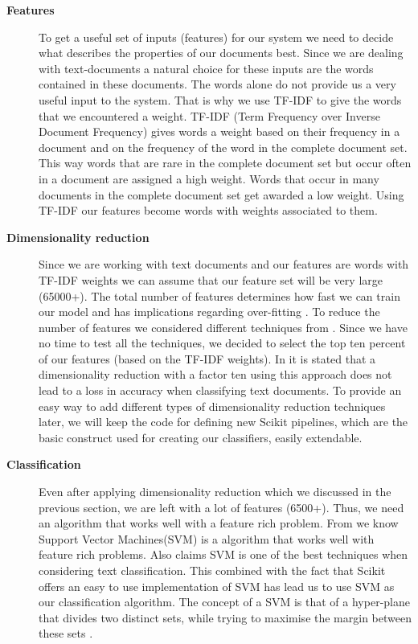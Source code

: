 \begin{description}
\item[\textbf{Features}] 
To get a useful set of inputs (features) for our system we need to decide what describes the properties of our documents best. Since we are dealing with text-documents a natural choice for these inputs are the words contained in these documents. 
The words alone do not provide us a very useful input to the system. That is why we use TF-IDF to give the words that we encountered a weight. TF-IDF (Term Frequency over Inverse Document Frequency) gives words a weight based on their frequency in a document and on the frequency of the word in the complete document set. This way words that are rare in the complete document set but occur often in a document are assigned a high weight. Words that occur in many documents in the complete document set get awarded a low weight\cite{ramos_tfidf}.
Using TF-IDF our features become words with weights associated to them.

\item[\textbf{Dimensionality reduction}]
Since we are working with text documents and our features are words with TF-IDF weights we can assume that our feature set will be very large (65000+). The total number of features determines how fast we can train our model and has implications regarding over-fitting \cite{ml_text}. To reduce the number of features we considered different techniques from \cite{ml_text}. Since we have no time to test all the techniques, we decided to select the top ten percent of our features (based on the TF-IDF weights). In \cite{yang1997} it is stated that a dimensionality reduction with a factor ten using this approach does not lead to a loss in accuracy when classifying text documents. To provide an easy way to add different types of dimensionality reduction techniques later, we will keep the code for defining new Scikit pipelines, which are the basic construct used for creating our classifiers, easily extendable.

\item[\textbf{Classification}]
Even after applying dimensionality reduction which we discussed in the previous section, we are left with a lot of features (6500+). Thus, we need an algorithm that works well with a feature rich problem. From \cite{MLCheatSheet} we know Support Vector Machines(SVM) is a algorithm that works well with feature rich problems. Also \cite{ml_text} claims SVM is one of the best techniques when considering text classification. This combined with the fact that Scikit offers an easy to use implementation of SVM has lead us to use SVM as our classification algorithm. The concept of a SVM is that of a hyper-plane that divides two distinct sets, while trying to maximise the margin between these sets \cite{tong2001support}.
\end{description}

